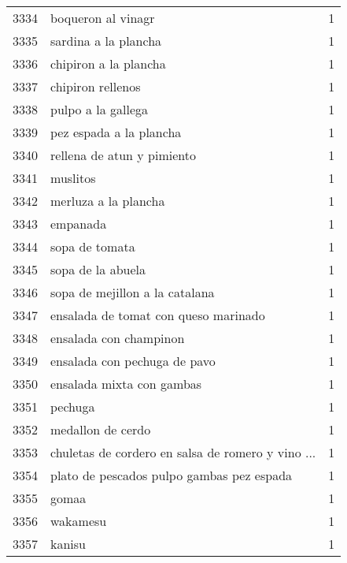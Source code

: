 \begin{tabular}{llr}
3334 &                                 boqueron al vinagr &      1 \\
3335 &                               sardina a la plancha &      1 \\
3336 &                              chipiron a la plancha &      1 \\
3337 &                                  chipiron rellenos &      1 \\
3338 &                                 pulpo a la gallega &      1 \\
3339 &                            pez espada a la plancha &      1 \\
3340 &                         rellena de atun y pimiento &      1 \\
3341 &                                           muslitos &      1 \\
3342 &                               merluza a la plancha &      1 \\
3343 &                                           empanada &      1 \\
3344 &                                     sopa de tomata &      1 \\
3345 &                                  sopa de la abuela &      1 \\
3346 &                     sopa de mejillon a la catalana &      1 \\
3347 &               ensalada de tomat con queso marinado &      1 \\
3348 &                             ensalada con champinon &      1 \\
3349 &                       ensalada con pechuga de pavo &      1 \\
3350 &                          ensalada mixta con gambas &      1 \\
3351 &                                            pechuga &      1 \\
3352 &                                  medallon de cerdo &      1 \\
3353 &  chuletas de cordero en salsa de romero y vino ... &      1 \\
3354 &          plato de pescados pulpo gambas pez espada &      1 \\
3355 &                                              gomaa &      1 \\
3356 &                                           wakamesu &      1 \\
3357 &                                             kanisu &      1 \\

\end{tabular}
